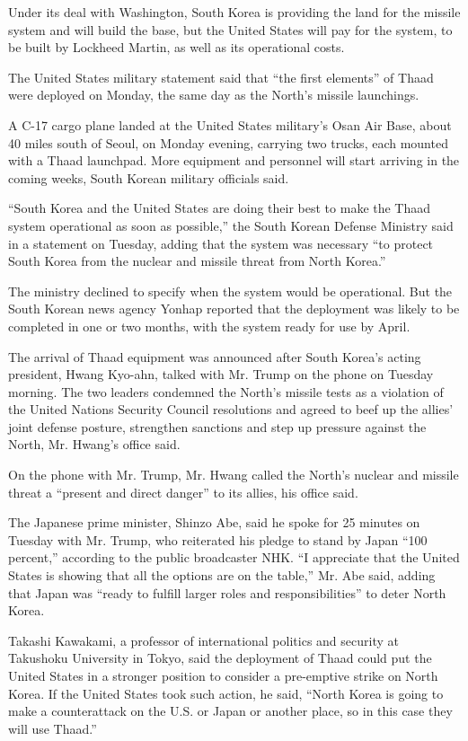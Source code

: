Under its deal with Washington, South Korea is providing the land for
the missile system and will build the base, but the United States will
pay for the system, to be built by Lockheed Martin, as well as its
operational costs.

The United States military statement said that ``the first elements'' of
Thaad were deployed on Monday, the same day as the North's missile
launchings.

A C-17 cargo plane landed at the United States military's Osan Air Base,
about 40 miles south of Seoul, on Monday evening, carrying two trucks,
each mounted with a Thaad launchpad. More equipment and personnel will
start arriving in the coming weeks, South Korean military officials
said.

``South Korea and the United States are doing their best to make the
Thaad system operational as soon as possible,'' the South Korean Defense
Ministry said in a statement on Tuesday, adding that the system was
necessary ``to protect South Korea from the nuclear and missile threat
from North Korea.''

The ministry declined to specify when the system would be operational.
But the South Korean news agency Yonhap reported that the deployment was
likely to be completed in one or two months, with the system ready for
use by April.

The arrival of Thaad equipment was announced after South Korea's acting
president, Hwang Kyo-ahn, talked with Mr. Trump on the phone on Tuesday
morning. The two leaders condemned the North's missile tests as a
violation of the United Nations Security Council resolutions and agreed
to beef up the allies' joint defense posture, strengthen sanctions and
step up pressure against the North, Mr. Hwang's office said.

On the phone with Mr. Trump, Mr. Hwang called the North's nuclear and
missile threat a ``present and direct danger'' to its allies, his office
said.

The Japanese prime minister, Shinzo Abe, said he spoke for 25 minutes on
Tuesday with Mr. Trump, who reiterated his pledge to stand by Japan
``100 percent,'' according to the public broadcaster NHK. ``I appreciate
that the United States is showing that all the options are on the
table,'' Mr. Abe said, adding that Japan was ``ready to fulfill larger
roles and responsibilities'' to deter North Korea.

Takashi Kawakami, a professor of international politics and security at
Takushoku University in Tokyo, said the deployment of Thaad could put
the United States in a stronger position to consider a pre-emptive
strike on North Korea. If the United States took such action, he said,
``North Korea is going to make a counterattack on the U.S. or Japan or
another place, so in this case they will use Thaad.''

